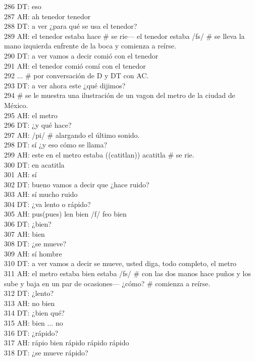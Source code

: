 286 DT: eso\\
287 AH: ah tenedor tenedor \\
288 DT: a ver ¿para qué se usa el tenedor?\\
289 AH: el tenedor estaba hace \# se rie--- el tenedor estaba /fs/ \# se lleva la mano izquierda enfrente de la boca y comienza a reírse.\\
290 DT: a ver vamos a decir comió con el tenedor\\
291 AH: el tenedor comió comí con el tenedor\\
292 ... \# por conversación de D y DT con AC.\\
293 DT: a ver ahora este ¿qué dijimos?\\
294 \# se le muestra una ilustración de un vagon del metro de la ciudad de México.\\
295 AH: el metro\\
296 DT: ¿y qué hace?\\
297 AH: /pi/ \# alargando el último sonido.\\
298 DT: sí ¿y eso cómo se llama?\\
299 AH: este en el metro estaba ((catitlan)) acatitla \# se rie.\\
300 DT: en acatitla\\
301 AH: sí\\
302 DT: bueno vamos a decir que ¿hace ruido?\\
303 AH: sí mucho ruido\\
304 DT: ¿va lento o rápido?\\
305 AH: pus(pues) len bien /f/ feo bien \\
306 DT: ¿bien?\\
307 AH: bien\\
308 DT: ¿se mueve?\\
309 AH: sí hombre\\
310 DT: a ver vamos a decir se mueve, usted diga, todo completo, el metro\\
311 AH: el metro estaba bien estaba /fs/ \# con las dos manos hace puños y los sube y baja en un par de ocasiones--- ¿cómo? \# comienza a reírse.\\
312 DT: ¿lento?\\
313 AH: no bien\\
314 DT: ¿bien qué?\\
315 AH: bien ... no\\
316 DT: ¿rápido?\\
317 AH: rápio bien rápido rápido rápido\\
318 DT: ¿se mueve rápido?\\
